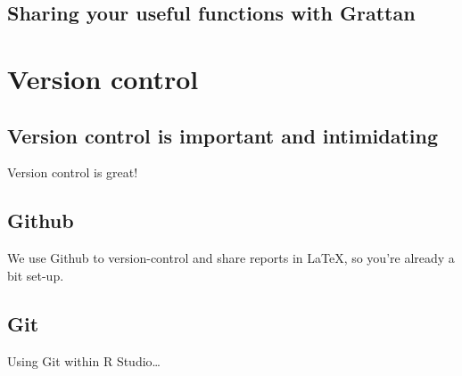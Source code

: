 \documentclass[]{book}
\begin{document}
\hypertarget{sharing-your-useful-functions-with-grattan}{%
\section{Sharing your useful functions with Grattan}\label{sharing-your-useful-functions-with-grattan}}

\hypertarget{version-control}{%
\chapter{Version control}\label{version-control}}

\hypertarget{version-control-is-important-and-intimidating}{%
\section{Version control is important and intimidating}\label{version-control-is-important-and-intimidating}}

Version control is great!

\hypertarget{github}{%
\section{Github}\label{github}}

We use Github to version-control and share reports in LaTeX, so you're already a bit set-up.

\hypertarget{git}{%
\section{Git}\label{git}}

Using Git within R Studio\ldots{}


\end{document}
